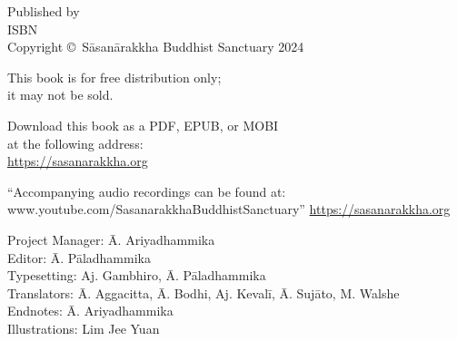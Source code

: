 \cleartoverso
\thispagestyle{empty}


{%

  \ifafiveversion \fontsize{10}{16}\selectfont \fi
  \ifasixversion \fontsize{7.5}{11}\selectfont \fi
  \ifbsixversion \fontsize{10}{16}\selectfont \fi
  \centering
  \setlength{\parindent}{0pt}%

  \ifafiveversion \vspace{0.5cm} \fi

  Published by \publisher\\
  ISBN \theISBN\\
  Copyright \copyright\ Sāsanārakkha Buddhist Sanctuary 2024

  \ifafiveversion \vspace{0.5cm} \fi
  \ifasixversion \vspace{0.4cm} \fi
  \ifbsixversion \vspace{0.5cm} \fi

  This book is for free distribution only;\\
  it may not be sold.

  \ifafiveversion \vspace{0.5cm} \fi
  \ifasixversion \vspace{0.4cm} \fi
  \ifbsixversion \vspace{0.5cm} \fi

  Download this book as a PDF, EPUB, or MOBI\\
  at the following address:\\
  \href{https://sasanarakkha.org/}{https://sasanarakkha.org}

  “Accompanying audio recordings can be found at: www.youtube.com/SasanarakkhaBuddhistSanctuary”
  \href{https://sasanarakkha.org/}{https://sasanarakkha.org}

  \ifafiveversion \vspace{0.5cm} \fi
  \ifasixversion \vspace{0.4cm} \fi
  \ifbsixversion \vspace{0.5cm} \fi

  Project Manager: Ā. Ariyadhammika\\
  Editor: Ā. Pāladhammika\\
  Typesetting: Aj. Gambhiro, Ā. Pāladhammika\\
  Translators: Ā. Aggacitta, Ā. Bodhi, Aj. Kevalī, Ā. Sujāto, M. Walshe\\
  Endnotes: Ā. Ariyadhammika\\
  Illustrations: Lim Jee Yuan


}
